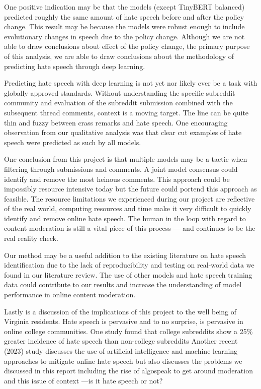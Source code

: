 \documentclass[conference]{IEEEtran}
\begin{document}
One positive indication may be that the models (except TinyBERT balanced) predicted roughly the same amount of hate speech before and after the policy change. This result may be because the models were robust enough to include evolutionary changes in speech due to the policy change. Although we are not able to draw conclusions about effect of the policy change, the primary purpose of this analysis, we are able to draw conclusions about the methodology of predicting hate speech through deep learning. 

Predicting hate speech with deep learning is not yet nor likely ever be a task with globally approved standards. Without understanding the specific subreddit community and evaluation of the subreddit submission combined with the subsequent thread comments, context is a moving target. The line can be quite thin and fuzzy between crass remarks and hate speech. One encouraging observation from our qualitative analysis was that clear cut examples of hate speech were predicted as such by all models. 

One conclusion from this project is that multiple models may be a tactic when filtering through submissions and comments. A joint model consensus could identify and remove the most heinous comments. This approach could be impossibly resource intensive today but the future could portend this approach as feasible. The resource limitations we experienced during our project are reflective of the real world, computing resources and time make it very difficult to quickly identify and remove online hate speech. The human in the loop with regard to content moderation is still a vital piece of this process --- and continues to be the real reality check.

Our method may be a useful addition to the existing literature on hate speech identification due to the lack of reproducibility and testing on real-world data we found in our literature review. The use of other models and hate speech training data could contribute to our results and increase the understanding of model performance in online content moderation.

Lastly is a discussion of the implications of this project to the well being of Virginia residents. Hate speech is pervasive and to no surprise, is pervasive in online college communities. One study found that college subreddits show a 25\% greater incidence of hate speech than non-college subreddits\cite{b26} Another recent (2023) study discusses the use of artificial intelligence and machine learning approaches to mitigate online hate speech but also discusses the problems we discussed in this report including the rise of algospeak to get around moderation and this issue of context\cite{b27} ---is it hate speech or not? 
\end{document}
